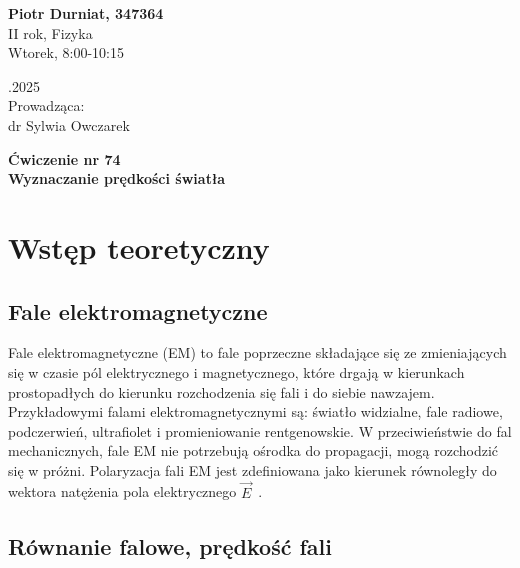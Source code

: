 \documentclass[a4paper,12pt]{article}
\begin{document}
\noindent
\begin{minipage}{0.5\textwidth}
    \raggedright
    \textbf{Piotr Durniat, 347364} \\
    II rok, Fizyka \\
    Wtorek, 8:00-10:15 \\
    \vspace{0.5cm}
\end{minipage}%
\begin{minipage}{0.5\textwidth}
    .2025 \\
    \vspace{0.5cm}
    Prowadząca: \\
    dr Sylwia Owczarek
\end{minipage}

\vspace{2cm}
\begin{center}
    \LARGE \textbf{Ćwiczenie nr 74} \\[0.5cm]
    \Large \textbf{Wyznaczanie prędkości światła}
\end{center}

\vspace{1cm} %
\noindent


\section{Wstęp teoretyczny}

\subsection*{Fale elektromagnetyczne}

Fale elektromagnetyczne (EM) to fale poprzeczne składające się ze zmieniających się w czasie pól elektrycznego i magnetycznego, które drgają w kierunkach prostopadłych do kierunku rozchodzenia się fali i do siebie nawzajem.
Przykładowymi falami elektromagnetycznymi są: światło widzialne, fale radiowe, podczerwień, ultrafiolet i promieniowanie rentgenowskie.
W przeciwieństwie do fal mechanicznych, fale EM nie potrzebują ośrodka do propagacji, mogą rozchodzić się w próżni.
Polaryzacja fali EM jest zdefiniowana jako kierunek równoległy do wektora natężenia pola elektrycznego $\vec{E}$~\citep{fizyka_dla_szkol_wyzszych_tom_3}.

\subsection*{Równanie falowe, prędkość fali}
\end{document}
